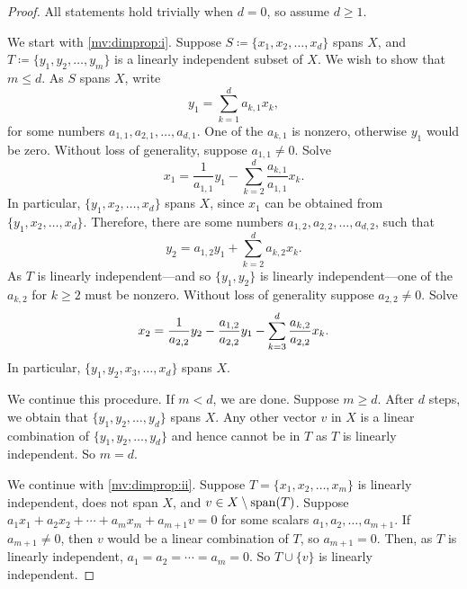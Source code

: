 \begin{proof}
All statements hold trivially when $d=0$, so assume $d \geq 1$.

We start with \ref{mv:dimprop:i}.
Suppose $S \coloneqq \{ x_1 , x_2, \ldots, x_d \}$ spans $X$, and
$T \coloneqq \{ y_1, y_2, \ldots, y_m \}$ is a linearly independent
subset of $X$.  We wish to show that $m \leq d$.
As $S$ spans $X$,
write
\begin{equation*}
y_1 = \sum_{k=1}^d a_{k,1} x_k ,
\end{equation*}
for some numbers $a_{1,1},a_{2,1},\ldots,a_{d,1}$.
One of the
$a_{k,1}$ is nonzero, otherwise $y_1$ would be zero.
Without loss of generality, suppose $a_{1,1} \neq 0$.  Solve
\begin{equation*}
x_1 = \frac{1}{a_{1,1}} y_1 - \sum_{k=2}^d \frac{a_{k,1}}{a_{1,1}} x_k .
\end{equation*}
In particular, $\{ y_1 , x_2, \ldots, x_d \}$ spans $X$, since $x_1$ can be
obtained from $\{ y_1 , x_2, \ldots, x_d \}$.  Therefore, there are some numbers
$a_{1,2},a_{2,2},\ldots,a_{d,2}$, such that
\begin{equation*}
y_2 = a_{1,2} y_1 + \sum_{k=2}^d a_{k,2} x_k .
\end{equation*}
As $T$ is linearly independent---and so $\{ y_1, y_2 \}$ is linearly
independent---one of the $a_{k,2}$
for $k \geq 2$ must be nonzero.  Without loss of generality suppose 
$a_{2,2} \neq 0$.  Solve
\begin{equation*}
x_2 = \frac{1}{a_{2,2}} y_2 - \frac{a_{1,2}}{a_{2,2}} y_1 - \sum_{k=3}^d
\frac{a_{k,2}}{a_{2,2}} x_k .
\avoidbreak
\end{equation*}
In particular,
$\{ y_1 , y_2, x_3, \ldots, x_d \}$ spans $X$.

We continue this procedure.  If $m < d$, we are done.  Suppose
$m \geq d$.
After $d$ steps, we obtain that 
$\{ y_1 , y_2, \ldots, y_d \}$ spans $X$.  Any
other vector $v$ in $X$ is a linear combination of
$\{ y_1 , y_2, \ldots, y_d \}$ and hence cannot be in $T$ as $T$ is
linearly independent.  So $m = d$.

We continue with \ref{mv:dimprop:ii}.
Suppose 
$T = \{x_1,x_2,\ldots,x_m\}$ is linearly independent,
does not span $X$, and $v \in X \setminus \operatorname{span} (T)$.
Suppose 
$a_1 x_1 + a_2 x_2 + \cdots + a_m x_m + a_{m+1} v = 0$
for some scalars $a_1,a_2,\ldots,a_{m+1}$.
If $a_{m+1} \neq 0$, then $v$ would be a linear combination of $T$,
so $a_{m+1} = 0$.  Then, as $T$ is linearly independent, $a_1=a_2=\cdots=a_m = 0$.
So $T \cup \{ v \}$ is linearly independent.


\end{proof}
